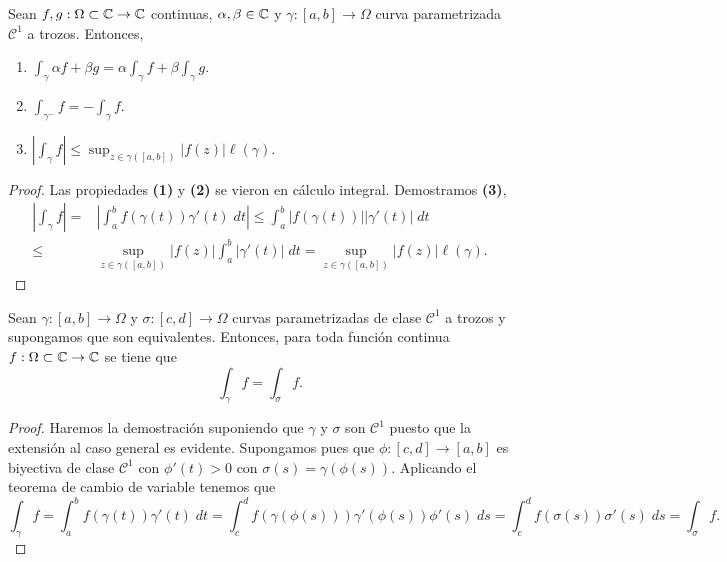 \begin{prop}
Sean $\displaystyle f, g : \Omega \subset \mathbb{C} \to \mathbb{C} $ continuas, $\displaystyle \alpha, \beta \in \mathbb{C} $ y $\displaystyle \gamma : \left[a,b\right] \to \Omega  $ curva parametrizada $\displaystyle \mathcal{C}^{1} $ a trozos. Entonces, 
	\begin{enumerate}
	\item $\displaystyle \int _{\gamma }\alpha f + \beta g = \alpha \int_{\gamma } f +\beta \int_{\gamma} g  $.
	\item $\displaystyle \int _{\gamma^{-} }f =-\int _{\gamma }f $. 
	\item $\displaystyle \left|\int _{\gamma }f \right|\leq \sup_{z \in \gamma\left(\left[a,b\right] \right)} \left|f\left(z\right)\right| \ell\left(\gamma \right) $.
	\end{enumerate}
\end{prop}
\begin{proof}
Las propiedades \textbf{(1)} y \textbf{(2)} se vieron en cálculo integral. Demostramos \textbf{(3)}, 
\[
\begin{split}
	\left|\int _{\gamma }f \right|= & \left|\int^{b}_{a} f\left(\gamma\left(t\right)\right)\gamma'\left(t\right) \; dt\right|\leq \int^{b}_{a} \left|f\left(\gamma\left(t\right)\right)\right| \left|\gamma'\left(t\right)\right| \; dt \\
	\leq & \sup_{z \in \gamma\left(\left[a,b\right] \right)} \left|f\left(z\right)\right| \int^{b}_{a} \left|\gamma'\left(t\right)\right| \; dt = \sup_{z \in \gamma\left(\left[a,b\right] \right)} \left|f\left(z\right)\right| \ell\left(\gamma \right).
\end{split}
\]
\end{proof}
\begin{prop}
	Sean $\displaystyle \gamma : \left[a,b\right] \to \Omega  $ y $\displaystyle \sigma : \left[c,d\right] \to \Omega  $ curvas parametrizadas de clase $\displaystyle \mathcal{C}^{1} $ a trozos y supongamos que son equivalentes. Entonces, para toda función continua $\displaystyle f : \Omega \subset \mathbb{C} \to \mathbb{C} $ se tiene que 
	\[\int _{\gamma }f =\int _{\sigma  }f  .\]
\end{prop}
\begin{proof}
	Haremos la demostración suponiendo que $\displaystyle \gamma  $ y $\displaystyle \sigma  $ son $\displaystyle \mathcal{C}^{1} $ puesto que la extensión al caso general es evidente. Supongamos pues que $\displaystyle \phi : \left[c,d\right] \to \left[a,b\right]  $ es biyectiva de clase $\displaystyle \mathcal{C}^{1} $ con $\displaystyle \phi'\left(t\right)>0 $ con $\displaystyle \sigma\left(s\right)=\gamma\left(\phi\left(s\right)\right) $. Aplicando el teorema de cambio de variable tenemos que 
	\[\int _{\gamma }f =\int^{b}_{a} f\left(\gamma\left(t\right)\right)\gamma'\left(t\right) \; dt = \int^{d}_{c} f\left(\gamma\left(\phi\left(s\right)\right)\right)\gamma'\left(\phi\left(s\right)\right)\phi'\left(s\right) \; d s = \int^{d}_{c} f\left(\sigma\left(s\right)\right) \sigma'\left(s\right) \; d s = \int _{\sigma }f .\]
\end{proof}


